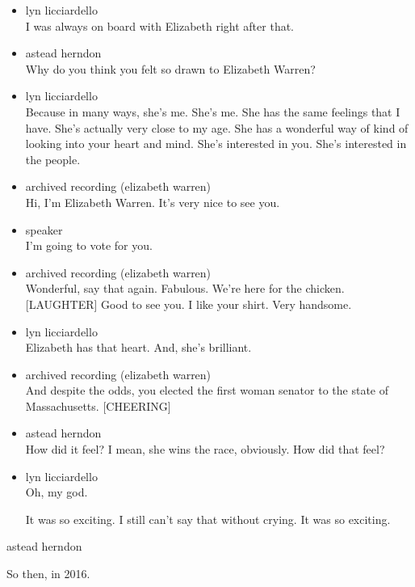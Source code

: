 \begin{itemize}
\item
  lyn licciardello\\
  I was always on board with Elizabeth right after that.
\item
  astead herndon\\
  Why do you think you felt so drawn to Elizabeth Warren?
\item
  lyn licciardello\\
  Because in many ways, she's me. She's me. She has the same feelings
  that I have. She's actually very close to my age. She has a wonderful
  way of kind of looking into your heart and mind. She's interested in
  you. She's interested in the people.
\item
  archived recording (elizabeth warren)\\
  Hi, I'm Elizabeth Warren. It's very nice to see you.
\item
  speaker\\
  I'm going to vote for you.
\item
  archived recording (elizabeth warren)\\
  Wonderful, say that again. Fabulous. We're here for the chicken.
  {[}LAUGHTER{]} Good to see you. I like your shirt. Very handsome.
\item
  lyn licciardello\\
  Elizabeth has that heart. And, she's brilliant.
\item
  archived recording (elizabeth warren)\\
  And despite the odds, you elected the first woman senator to the state
  of Massachusetts. {[}CHEERING{]}
\item
  astead herndon\\
  How did it feel? I mean, she wins the race, obviously. How did that
  feel?
\item
  lyn licciardello\\
  Oh, my god.

  It was so exciting. I still can't say that without crying. It was so
  exciting.
\end{itemize}

astead herndon

So then, in 2016.

